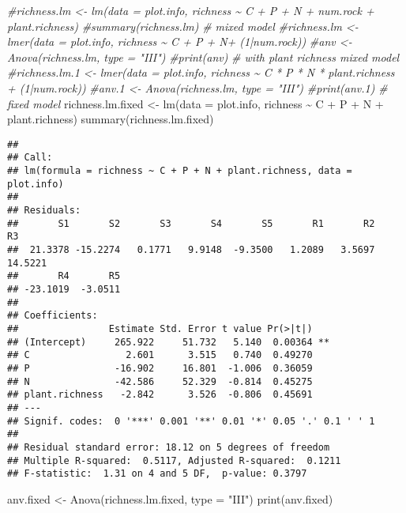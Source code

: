 \documentclass[
]{article}
\newenvironment{Shaded}{\begin{snugshade}}{\end{snugshade}}
\newcommand{\AttributeTok}[1]{\textcolor[rgb]{0.77,0.63,0.00}{#1}}
\newcommand{\CommentTok}[1]{\textcolor[rgb]{0.56,0.35,0.01}{\textit{#1}}}
\newcommand{\FunctionTok}[1]{\textcolor[rgb]{0.00,0.00,0.00}{#1}}
\newcommand{\NormalTok}[1]{#1}
\newcommand{\OtherTok}[1]{\textcolor[rgb]{0.56,0.35,0.01}{#1}}
\newcommand{\SpecialCharTok}[1]{\textcolor[rgb]{0.00,0.00,0.00}{#1}}
\newcommand{\StringTok}[1]{\textcolor[rgb]{0.31,0.60,0.02}{#1}}
\begin{document}
\begin{Shaded}
\begin{Highlighting}[]
\CommentTok{\#richness.lm \textless{}{-} lm(data = plot.info, richness \textasciitilde{} C + P + N + num.rock + plant.richness)}
\CommentTok{\#summary(richness.lm)}
\CommentTok{\# mixed model}
\CommentTok{\#richness.lm \textless{}{-} lmer(data = plot.info, richness \textasciitilde{} C + P + N+ (1|num.rock))}
\CommentTok{\#anv \textless{}{-} Anova(richness.lm, type = "III")}
\CommentTok{\#print(anv)}
\CommentTok{\# with plant richness mixed model}
\CommentTok{\#richness.lm.1 \textless{}{-} lmer(data = plot.info, richness \textasciitilde{} C * P * N * plant.richness + (1|num.rock))}
\CommentTok{\#anv.1 \textless{}{-} Anova(richness.lm, type = "III")}
\CommentTok{\#print(anv.1)}
\CommentTok{\# fixed model}
\NormalTok{richness.lm.fixed }\OtherTok{\textless{}{-}} \FunctionTok{lm}\NormalTok{(}\AttributeTok{data =}\NormalTok{ plot.info, richness }\SpecialCharTok{\textasciitilde{}}\NormalTok{ C }\SpecialCharTok{+}\NormalTok{ P }\SpecialCharTok{+}\NormalTok{ N }\SpecialCharTok{+}\NormalTok{ plant.richness)}
\FunctionTok{summary}\NormalTok{(richness.lm.fixed)}
\end{Highlighting}
\end{Shaded}

\begin{verbatim}
## 
## Call:
## lm(formula = richness ~ C + P + N + plant.richness, data = plot.info)
## 
## Residuals:
##       S1       S2       S3       S4       S5       R1       R2       R3 
##  21.3378 -15.2274   0.1771   9.9148  -9.3500   1.2089   3.5697  14.5221 
##       R4       R5 
## -23.1019  -3.0511 
## 
## Coefficients:
##                Estimate Std. Error t value Pr(>|t|)   
## (Intercept)     265.922     51.732   5.140  0.00364 **
## C                 2.601      3.515   0.740  0.49270   
## P               -16.902     16.801  -1.006  0.36059   
## N               -42.586     52.329  -0.814  0.45275   
## plant.richness   -2.842      3.526  -0.806  0.45691   
## ---
## Signif. codes:  0 '***' 0.001 '**' 0.01 '*' 0.05 '.' 0.1 ' ' 1
## 
## Residual standard error: 18.12 on 5 degrees of freedom
## Multiple R-squared:  0.5117, Adjusted R-squared:  0.1211 
## F-statistic:  1.31 on 4 and 5 DF,  p-value: 0.3797
\end{verbatim}

\begin{Shaded}
\begin{Highlighting}[]
\NormalTok{anv.fixed }\OtherTok{\textless{}{-}} \FunctionTok{Anova}\NormalTok{(richness.lm.fixed, }\AttributeTok{type =} \StringTok{"III"}\NormalTok{)}
\FunctionTok{print}\NormalTok{(anv.fixed)}
\end{Highlighting}
\end{Shaded}
\end{document}
